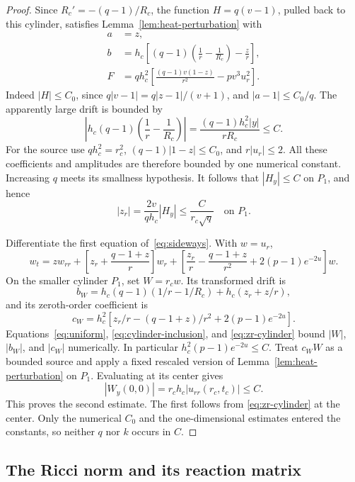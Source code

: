\begin{proof}
Since \(R_c'=-(q-1)/R_c\), the function \(H=q(v-1)\), pulled back to
this cylinder, satisfies Lemma~\ref{lem:heat-perturbation} with
\begin{equation}\label{eq:H-coefficients}
\begin{aligned}
a&=z,\\
b&=h_c\left[(q-1)\left(\frac1r-\frac1{R_c}\right)-\frac zr\right],\\
F&=qh_c^2\left[\frac{(q-1)v(1-z)}{r^2}-pv^3u_r^2\right].
\end{aligned}
\end{equation}
Indeed \(|H|\le C_0\), since
\(q|v-1|=q|z-1|/(v+1)\), and \(|a-1|\le C_0/q\).
The apparently large drift is bounded by
\[
\left|h_c(q-1)\left(\frac1r-\frac1{R_c}\right)\right|
=\frac{(q-1)h_c^2|y|}{rR_c}\le C.
\]
For the source use \(qh_c^2=r_c^2\),
\((q-1)|1-z|\le C_0\), and \(r|u_r|\le2\).
All these coefficients and amplitudes are therefore bounded by
one numerical constant. Increasing \(q\) meets its smallness hypothesis.
It follows that \(|H_y|\le C\) on \(P_1\), and hence
\begin{equation}\label{eq:zr-cylinder}
|z_r|=\frac{2v}{qh_c}|H_y|\le\frac{C}{r_c\sqrt q}
\quad\text{on }P_1.
\end{equation}

Differentiate the first equation of~\eqref{eq:sideways}. With \(w=u_r\),
\begin{equation}\label{eq:ur-equation}
w_t=zw_{rr}+\left[z_r+\frac{q-1+z}{r}\right]w_r
+\left[\frac{z_r}{r}-\frac{q-1+z}{r^2}
          +2(p-1)e^{-2u}\right]w.
\end{equation}
On the smaller cylinder \(P_1\), set \(W=r_cw\). Its transformed drift is
\[
b_W=h_c(q-1)(1/r-1/R_c)+h_c(z_r+z/r),
\]
and its zeroth-order coefficient is
\[
c_W=h_c^2\left[z_r/r-(q-1+z)/r^2+2(p-1)e^{-2u}\right].
\]
Equations~\eqref{eq:uniform}, \eqref{eq:cylinder-inclusion}, and
\eqref{eq:zr-cylinder} bound \(|W|\), \(|b_W|\), and \(|c_W|\)
numerically. In particular \(h_c^2(p-1)e^{-2u}\le C\).
Treat \(c_WW\) as a bounded source and apply a fixed rescaled version of
Lemma~\ref{lem:heat-perturbation} on \(P_1\). Evaluating at its center
gives
\[
|W_y(0,0)|=r_ch_c|u_{rr}(r_c,t_c)|\le C.
\]
This proves the second estimate. The first follows from
\eqref{eq:zr-cylinder} at the center. Only the numerical \(C_0\) and
the one-dimensional estimates entered the constants, so neither
\(q\) nor \(k\) occurs in \(C\).
\end{proof}

\subsection{The Ricci norm and its reaction matrix}

